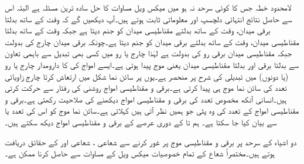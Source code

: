 لامحدود خطہ جس کا کوئی سرحد نہ ہو میں میکس ویل مساوات کا حل سادہ ترین مسئلہ ہے البتہ اس سے حاصل نتائج انتہائی دلچسپ اور معلوماتی ثابت ہوتے ہیں۔آپ دیکھیں گے کہ وقت کے ساتھ بدلتا برقی میدان، وقت کے ساتھ بدلتے مقناطیسی میدان کو جنم دیتا ہے جبکہ وقت کے ساتھ بدلتا مقناطیسی میدان، وقت کے ساتھ بدلتے برقی میدان کو جنم دیتا ہے۔چونکہ برقی میدان چارج کی بدولت جبکہ مقناطیسی میدان برقی رو کی بدولت ہے لہٰذا چارج یا رو میں کسی بھی تبدیل سے  باہمی تعاون سے بدلتا برقی اور بدلتا مقناطیسی میدان یعنی  موج پیدا ہوتی ہے۔ایسے امواج کی  کا دارومدار چارج یا رو (یا دونوں) میں تبدیلی کی شرح پر منحصر ہے۔یوں   پر سائن نما شکل میں ارتعاش کرتا چارج  زاویائی تعدد کی سائن نما موج ہی پیدا کرتی ہے۔برقی و مقناطیسی امواج  روشنی کی رفتار سے حرکت کرتی ہیں۔انسانی آنکھ مخصوص تعدد کی برقی و مقناطیسی امواج دیکھنے کی صلاحیت رکھتی ہے۔برقی و مقناطیسی امواج کے تعدد کی وہ پٹی جو ہمیں نظر آتی ہیں  کہلاتی ہے۔سائن نما موج کو اس کی تعدد  یا   سے بیان کیا جا سکتا ہے۔ ہم  تا  کے دوری عرصے کے برقی و مقناطیسی امواج دیکھ سکتے ہیں۔

دو اشیاء کے سرحد پر برقی و مقناطیسی موج پر غور کرنے سے  شعاعی ، شعاعی  اور   کے حقائق دریافت ہوتے ہیں۔مختصراً شعاع کے تمام خصوصیات میکس ویل کے مساوات سے حاصل کرنا ممکن ہے۔

